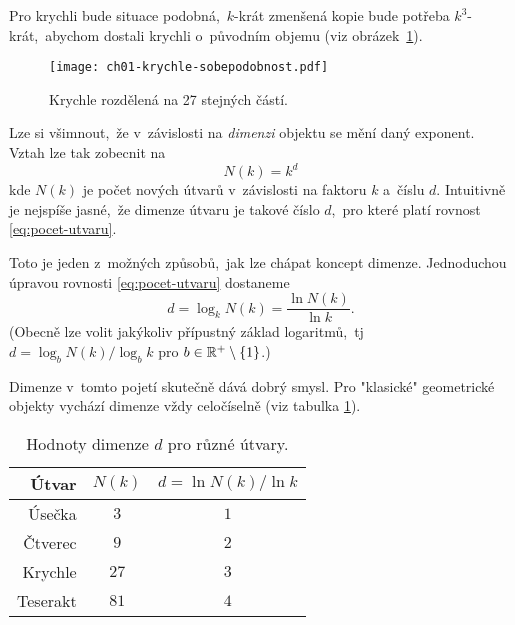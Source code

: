 Pro krychli bude situace podobná,~$k$-krát zmenšená kopie bude potřeba $k^3$-krát,~abychom dostali krychli o~původním objemu (viz obrázek~\ref{fig:krychle-sobepodobnost}).
\begin{figure}[h]
    \centering
    \texttt{[image: ch01-krychle-sobepodobnost.pdf]}
    \caption{Krychle rozdělená na 27 stejných částí.}
    \label{fig:krychle-sobepodobnost}
\end{figure}
Lze si všimnout,~že v~závislosti na \emph{dimenzi} objektu se mění daný exponent. Vztah lze tak zobecnit na
\begin{equation}\label{eq:pocet-utvaru}
    N(k)=k^d
\end{equation}
kde $N(k)$ je počet nových útvarů v~závislosti na faktoru $k$ a~číslu $d$. Intuitivně je nejspíše jasné,~že dimenze útvaru je takové číslo $d$,~pro které platí rovnost \eqref{eq:pocet-utvaru}.

Toto je jeden z~možných způsobů,~jak lze chápat koncept dimenze. Jednoduchou úpravou rovnosti \eqref{eq:pocet-utvaru} dostaneme
\[d=\log_k{N(k)}=\dfrac{\ln{N(k)}}{\ln{k}}.\]
(Obecně lze volit jakýkoliv přípustný základ logaritmů,~tj $d=\log_b{N(k)}/\log_b{k}$ pro $b\in\mathbb{R}^+\setminus\left\{1\right\}$.)

Dimenze v~tomto pojetí skutečně dává dobrý smysl. Pro "klasické" geometrické objekty vychází dimenze vždy celočíselně (viz tabulka \ref{table:eukleides-dimenze}).
\begin{table}[h]
    \centering
    \begin{tabular}{r|cc}
    Útvar    & $N(k)$ & $d=\ln{N(k)}/\ln{k}$ \\ \hline
    Úsečka   & $3$      & $1$                          \\
    Čtverec  & $9$      & $2$                          \\
    Krychle  & $27$     & $3$                          \\
    Teserakt & $81$     & $4$                          \\
    \end{tabular}
    \caption{Hodnoty dimenze $d$ pro různé útvary.}
    \label{table:eukleides-dimenze}
\end{table}

